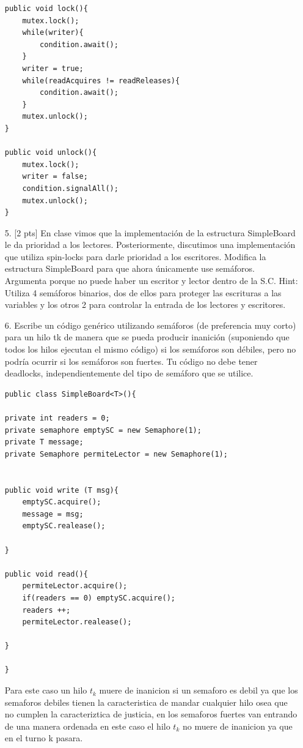 \documentclass[12pt, letterpaper]{article}
\begin{document}
\begin{itemize}
\begin{minipage}{0.45\linewidth}
\begin{lstlisting}
public void lock(){
	mutex.lock();
	while(writer){
		condition.await();
	}	
	writer = true;
	while(readAcquires != readReleases){
		condition.await();
	}
	mutex.unlock();
}

public void unlock(){
	mutex.lock();
	writer = false;
	condition.signalAll();
	mutex.unlock();
}

\end{lstlisting}
\end{minipage}

\item[5. ][2 pts] En clase vimos que la implementación de la estructura SimpleBoard le
da prioridad a los lectores. Posteriormente, discutimos una implementación que
utiliza spin-locks para darle prioridad a los escritores. Modifica la estructura
SimpleBoard para que ahora únicamente use semáforos. Argumenta porque no
puede haber un escritor y lector dentro de la S.C. Hint: Utiliza 4 semáforos
binarios, dos de ellos para proteger las escrituras a las variables y los otros 2
para controlar la entrada de los lectores y escritores.

\item[6. ]Escribe un código genérico utilizando semáforos (de preferencia muy corto)
para un hilo tk de manera que se pueda producir inanición (suponiendo que
todos los hilos ejecutan el mismo código) si los semáforos son débiles, pero no
podría ocurrir si los semáforos son fuertes. Tu código no debe tener deadlocks,
independientemente del tipo de semáforo que se utilice.


\begin{lstlisting}
public class SimpleBoard<T>(){

private int readers = 0;
private semaphore emptySC = new Semaphore(1);
private T message;
private Semaphore permiteLector = new Semaphore(1);


public void write (T msg){
	emptySC.acquire();
	message = msg;
	emptySC.realease();

} 

public void read(){
	permiteLector.acquire();
	if(readers == 0) emptySC.acquire();
	readers ++;
	permiteLector.realease();

}

}

\end{lstlisting}


Para este caso un hilo $t_{k}$ muere de inanicion si un semaforo es debil ya que los semaforos debiles tienen la caracteristica de mandar cualquier hilo osea que no cumplen la caracteriztica de justicia, en los semaforos fuertes van entrando de una manera ordenada en este caso el hilo $t_{k}$ no muere de inanicion ya que en el turno k pasara.




\end{itemize}
\end{document}
